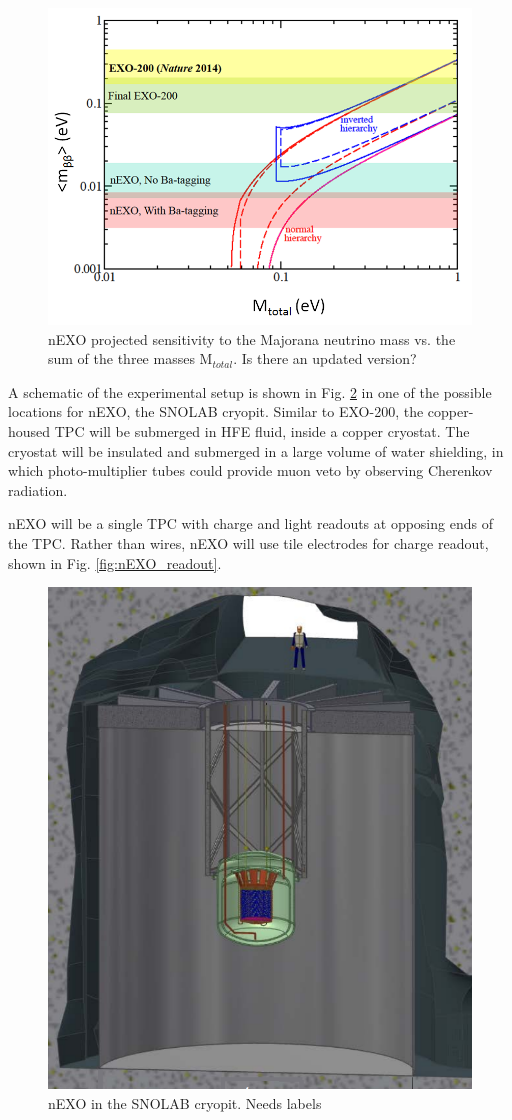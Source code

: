 \begin{figure}[H]
	\centering
	\includegraphics[width=.7\textwidth]{figures/sensitivity.png}
	\caption{nEXO projected sensitivity to the Majorana neutrino mass vs. the sum of the three masses M$_{total}$. {\color{red}Is there an updated version?}}
\label{fig:sensitivity_nEXO}
\end{figure}

A schematic of the experimental setup is shown in Fig. \ref{fig:nEXO_cryopit} in one of the possible locations for nEXO, the SNOLAB cryopit.  Similar to EXO-200, the copper-housed TPC will be submerged in HFE fluid, inside a copper cryostat.  The cryostat will be insulated and submerged in a large volume of water shielding, in which photo-multiplier tubes could provide muon veto by observing Cherenkov radiation.

nEXO will be a single TPC with charge and light readouts at opposing ends of the TPC.  Rather than wires, nEXO will use tile electrodes for charge readout, shown in Fig. \ref{fig:nEXO_readout}.

\begin{figure}[H]
	\centering
	\includegraphics[width=.7\textwidth]{figures/nEXO_cryopit.png}
	\caption{nEXO in the SNOLAB cryopit. {\color{red}Needs labels}}
\label{fig:nEXO_cryopit}
\end{figure}

